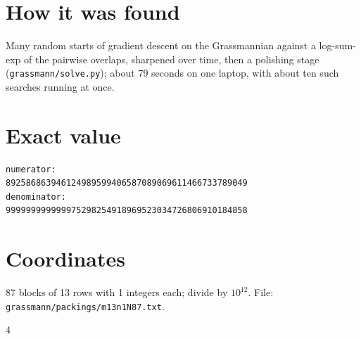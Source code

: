 \documentclass[11pt,a4paper]{article}
\begin{document}
\section{How it was found}
Many random starts of gradient descent on the Grassmannian against a log-sum-exp of the pairwise overlaps, sharpened over time, then a polishing stage (\texttt{grassmann/solve.py}); about 79 seconds on one laptop, with about ten such searches running at once.


\appendix
\section{Exact value}
{\small
\begin{verbatim}
numerator:
892586863946124989599406587089069611466733789049
denominator:
999999999999975298254918969523034726806910184858
\end{verbatim}}

\section{Coordinates}
87 blocks of 13 rows with 1 integers each; divide by $10^{12}$. File: \texttt{grassmann/packings/m13n1N87.txt}.
{\tiny
\begin{multicols}{4}
\end{multicols}}
\end{document}
